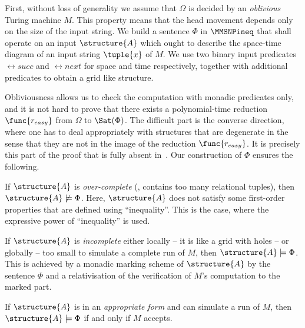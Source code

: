 \documentclass{lmcs}
\begin{document}
First, without loss of generality we assume that $\Omega$ is decided by an \emph{oblivious} Turing machine $M$. 
%
This property means that the head movement depends only on the size of the input string.  
%
We build a sentence $\Phi$ in $\MMSNPineq$ that shall operate on an input $\structure{A}$ which ought to describe the space-time diagram of an input string $\tuple{x}$ of $M$. 
%
We use two binary input predicates $\rel{succ}$ and $\rel{next}$ for space and time respectively, together with additional predicates to obtain a grid like structure.



Obliviousness allows us to check the computation with monadic predicates only, and it is not hard to prove that there exists a polynomial-time reduction $\func{r_{easy}}$ from $\Omega$ to $\Sat(\Phi)$.
%
The difficult part is the converse direction, where one has to deal appropriately with structures that are degenerate in the sense that they are not in the image of the reduction $\func{r_{easy}}$.
%
It is precisely this part of the proof that is fully absent in~\cite{federvardi1998}. 
%
Our construction of $\Phi$ ensures the following.
\begin{compactitem}
\item If $\structure{A}$ is \emph{over-complete} (\ie, contains too many relational tuples), then $\structure{A}\not\models\Phi$. Here, $\structure{A}$ does not satisfy some first-order properties that are defined using ``inequality''. This is the case, where the expressive power of ``inequality'' is used.
\item If $\structure{A}$ is \emph{incomplete} either locally -- it is like a grid with holes -- or globally -- too small to simulate a complete run of $M$, then $\structure{A}\models\Phi$. This is achieved by a monadic marking scheme of $\structure{A}$ by the sentence $\Phi$ and a relativisation of the verification of $M$'s computation to the marked part.
\item If $\structure{A}$ is in an \emph{appropriate form} and can simulate a run of $M$, then $\structure{A}\models\Phi$ if and only if $M$ accepts.
\end{compactitem}
\end{document}
